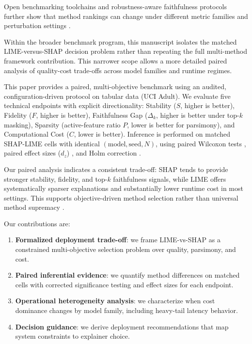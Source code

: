\documentclass[twoside,11pt]{article}
\begin{document}
Open benchmarking toolchains and robustness-aware faithfulness
protocols further show that method rankings can change under different
metric families and perturbation settings
\citep{agarwal2022openxai,sithakoul2024beexai,zheng2025ffidelity}.

Within the broader benchmark program, this manuscript isolates the
matched LIME-versus-SHAP decision problem rather than repeating the
full multi-method framework contribution. This narrower scope allows a
more detailed paired analysis of quality-cost trade-offs across model
families and runtime regimes.

This paper provides a paired, multi-objective benchmark using an
audited, configuration-driven protocol on tabular data (UCI Adult). We
evaluate five technical endpoints with explicit directionality:
Stability (\(S\), higher is better), Fidelity (\(F\), higher is
better), Faithfulness Gap (\(\Delta_k\), higher is better under
top-\(k\) masking), Sparsity (active-feature ratio \(P\), lower is
better for parsimony), and Computational Cost (\(C\), lower is better).
Inference is performed on matched SHAP-LIME cells with identical
\((\mathrm{model},\mathrm{seed},N)\), using paired Wilcoxon tests
\citep{wilcoxon1945individual}, paired effect sizes (\(d_z\))
\citep{lakens2013calculating}, and Holm correction
\citep{holm1979simple}.

Our paired analysis indicates a consistent trade-off: SHAP tends to
provide stronger stability, fidelity, and top-\(k\) faithfulness
signals, while LIME offers systematically sparser explanations and
substantially lower runtime cost in most settings. This supports
objective-driven method selection rather than universal method supremacy
\citep{agrawal2025xaieval}.

Our contributions are:
\begin{enumerate}[leftmargin=*]
\item \textbf{Formalized deployment trade-off}: we frame LIME-vs-SHAP as a
constrained multi-objective selection problem over quality, parsimony, and
cost.
\item \textbf{Paired inferential evidence}: we quantify method differences on
matched cells with corrected significance testing and effect sizes for each
endpoint.
\item \textbf{Operational heterogeneity analysis}: we characterize when cost
dominance changes by model family, including heavy-tail latency behavior.
\item \textbf{Decision guidance}: we derive deployment recommendations that map
system constraints to explainer choice.
\end{enumerate}
\end{document}
